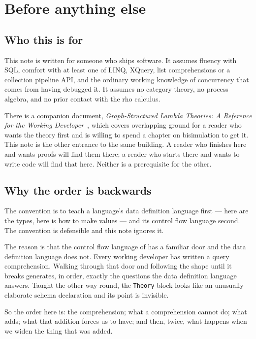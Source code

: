 \section{Before anything else}
\label{sec:preface}

\subsection{Who this is for}

This note is written for someone who ships software. It assumes fluency with
SQL, comfort with at least one of LINQ, XQuery, list comprehensions or a
collection pipeline API, and the ordinary working knowledge of concurrency that
comes from having debugged it. It assumes no category theory, no process
algebra, and no prior contact with the rho calculus.

There is a companion document, \emph{Graph-Structured Lambda Theories: A
Reference for the Working Developer}~\cite{GSLTintro}, which covers overlapping ground for a
reader who wants the theory first and is willing to spend a chapter on
bisimulation to get it. This note is the other entrance to the same building. A
reader who finishes here and wants proofs will find them there; a reader who
starts there and wants to write code will find that here. Neither is a
prerequisite for the other.

\subsection{Why the order is backwards}

The convention is to teach a language's data definition language first --- here
are the types, here is how to make values --- and its control flow language
second. The convention is defensible and this note ignores it.

The reason is that the control flow language of \flang{} has a familiar door and
the data definition language does not. Every working developer has written a
query comprehension. Walking through that door and following the shape until it
breaks generates, in order, exactly the questions the data definition language
answers. Taught the other way round, the \texttt{Theory} block looks like an
unusually elaborate schema declaration and its point is invisible.

So the order here is: the comprehension; what a comprehension cannot do; what
\flang{} adds; what that addition forces us to have; and then, twice, what
happens when we widen the thing that was added.

